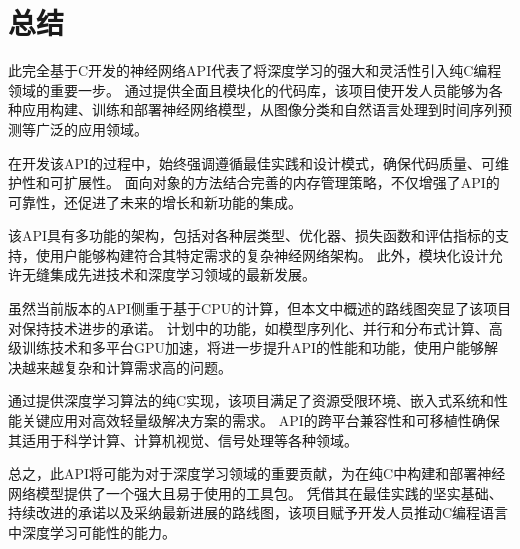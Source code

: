 \chapter*{总结}

\par 此完全基于C开发的神经网络API代表了将深度学习的强大和灵活性引入纯C编程领域的重要一步。
通过提供全面且模块化的代码库，该项目使开发人员能够为各种应用构建、训练和部署神经网络模型，从图像分类和自然语言处理到时间序列预测等广泛的应用领域。

\par 在开发该API的过程中，始终强调遵循最佳实践和设计模式，确保代码质量、可维护性和可扩展性。
面向对象的方法结合完善的内存管理策略，不仅增强了API的可靠性，还促进了未来的增长和新功能的集成。

\par 该API具有多功能的架构，包括对各种层类型、优化器、损失函数和评估指标的支持，使用户能够构建符合其特定需求的复杂神经网络架构。
此外，模块化设计允许无缝集成先进技术和深度学习领域的最新发展。

\par 虽然当前版本的API侧重于基于CPU的计算，但本文中概述的路线图突显了该项目对保持技术进步的承诺。
计划中的功能，如模型序列化、并行和分布式计算、高级训练技术和多平台GPU加速，将进一步提升API的性能和功能，使用户能够解决越来越复杂和计算需求高的问题。

\par 通过提供深度学习算法的纯C实现，该项目满足了资源受限环境、嵌入式系统和性能关键应用对高效轻量级解决方案的需求。
API的跨平台兼容性和可移植性确保其适用于科学计算、计算机视觉、信号处理等各种领域。

\par 总之，此API将可能为对于深度学习领域的重要贡献，为在纯C中构建和部署神经网络模型提供了一个强大且易于使用的工具包。
凭借其在最佳实践的坚实基础、持续改进的承诺以及采纳最新进展的路线图，该项目赋予开发人员推动C编程语言中深度学习可能性的能力。
